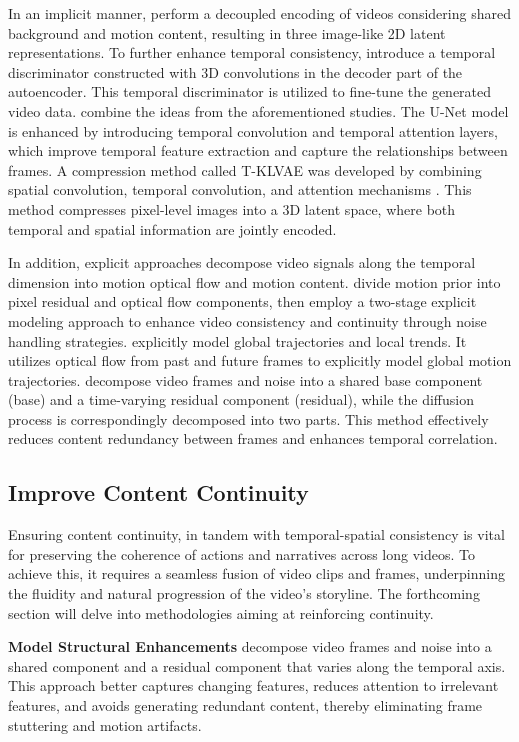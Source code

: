 \documentclass{article}
\begin{document}
In an implicit manner, \cite{PVDM} perform a decoupled encoding of videos considering shared background and motion content, resulting in three image-like 2D latent representations. To further enhance temporal consistency, \cite{align} introduce a temporal discriminator constructed with 3D convolutions in the decoder part of the autoencoder. This temporal discriminator is utilized to fine-tune the generated video data. \cite{VidRD} combine the ideas from the aforementioned studies. The U-Net model is enhanced by introducing temporal convolution and temporal attention layers, which improve temporal feature extraction and capture the relationships between frames. A compression method called T-KLVAE was developed by combining spatial convolution, temporal convolution, and attention mechanisms \citep{NUWA-infinity}. This method compresses pixel-level images into a 3D latent space, where both temporal and spatial information are jointly encoded.


In addition, explicit approaches decompose video signals along the temporal dimension into motion optical flow and motion content. \cite{Control-A-Video} divide motion prior into pixel residual and optical flow components, then employ a two-stage explicit modeling approach to enhance video consistency and continuity through noise handling strategies. \cite{MV-Diffusion} explicitly model global trajectories and local trends. It utilizes optical flow from past and future frames to explicitly model global motion trajectories. \cite{VideoFusion} decompose video frames and noise into a shared base component (base) and a time-varying residual component (residual), while the diffusion process is correspondingly decomposed into two parts. This method effectively reduces content redundancy between frames and enhances temporal correlation. 
\subsection{Improve Content Continuity}
Ensuring content continuity, in tandem with temporal-spatial consistency is vital for preserving the coherence of actions and narratives across long videos. To achieve this, it requires a seamless fusion of video clips and frames, underpinning the fluidity and natural progression of the video's storyline. The forthcoming section will delve into methodologies aiming at reinforcing continuity. 


\noindent\textbf{Model Structural Enhancements } \cite{VideoFusion} decompose video frames and noise into a shared component and a residual component that varies along the temporal axis. This approach better captures changing features, reduces attention to irrelevant features, and avoids generating redundant content, thereby eliminating frame stuttering and motion artifacts.
\end{document}
